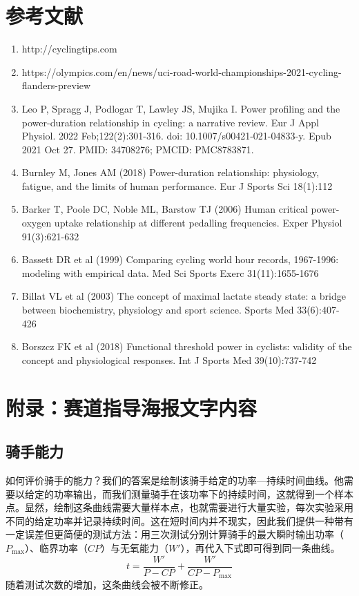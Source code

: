 \documentclass[11pt,a4paper]{ctexart}
\begin{document}
\section*{参考文献}

\begin{enumerate}
\item[{[1]}] http://cyclingtips.com
\item[{[2]}] https://olympics.com/en/news/uci-road-world-championships-2021-cycling-flanders-preview
\item[{[3]}] Leo P, Spragg J, Podlogar T, Lawley JS, Mujika I. Power profiling and the power-duration relationship in cycling: a narrative review. Eur J Appl Physiol. 2022 Feb;122(2):301-316. doi: 10.1007/s00421-021-04833-y. Epub 2021 Oct 27. PMID: 34708276; PMCID: PMC8783871.
\item[{[4]}] Burnley M, Jones AM (2018) Power-duration relationship: physiology, fatigue, and the limits of human performance. Eur J Sports Sci 18(1):112
\item[{[5]}] Barker T, Poole DC, Noble ML, Barstow TJ (2006) Human critical power-oxygen uptake relationship at different pedalling frequencies. Exper Physiol 91(3):621-632
\item[{[6]}] Bassett DR et al (1999) Comparing cycling world hour records, 1967-1996: modeling with empirical data. Med Sci Sports Exerc 31(11):1655-1676
\item[{[7]}] Billat VL et al (2003) The concept of maximal lactate steady state: a bridge between biochemistry, physiology and sport science. Sports Med 33(6):407-426
\item[{[8]}] Borszcz FK et al (2018) Functional threshold power in cyclists: validity of the concept and physiological responses. Int J Sports Med 39(10):737-742
\end{enumerate}

\section*{附录：赛道指导海报文字内容}

\subsection*{骑手能力}

如何评价骑手的能力？我们的答案是绘制该骑手给定的功率—持续时间曲线。他需要以给定的功率输出，而我们测量骑手在该功率下的持续时间，这就得到一个样本点。显然，绘制这条曲线需要大量样本点，也就需要进行大量实验，每次实验采用不同的给定功率并记录持续时间。这在短时间内并不现实，因此我们提供一种带有一定误差但更简便的测试方法：用三次测试分别计算骑手的最大瞬时输出功率（$P_{\max}$）、临界功率（$CP$）与无氧能力（$W'$），再代入下式即可得到同一条曲线。
\[
t=\frac{W'}{P-CP}+\frac{W'}{CP-P_{\max}}
\]
随着测试次数的增加，这条曲线会被不断修正。
\end{document}
